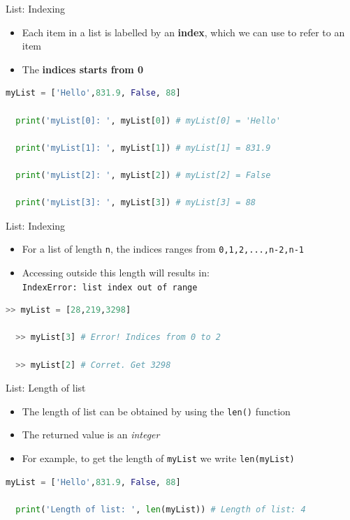\documentclass[10pt,xcolor={table,dvipsnames},t]{beamer}
\begin{document}
\begin{frame}[fragile]{List: Indexing}
  \begin{itemize}
    \item Each item in a list is labelled by an \textbf{index}, which we can use to refer to an item 
    \item The \textbf{indices starts from 0}
  \end{itemize}
\begin{lstlisting}[language=python]
  myList = ['Hello',831.9, False, 88]

  print('myList[0]: ', myList[0]) # myList[0] = 'Hello'

  print('myList[1]: ', myList[1]) # myList[1] = 831.9

  print('myList[2]: ', myList[2]) # myList[2] = False

  print('myList[3]: ', myList[3]) # myList[3] = 88
\end{lstlisting}
\end{frame}

\begin{frame}[fragile]{List: Indexing}
  \begin{itemize}
    \item For a list of length \texttt{n}, the indices ranges from \texttt{0,1,2,...,n-2,n-1}
    \item Accessing outside this length will results in:\\
     \texttt{IndexError: list index out of range}
  \end{itemize}
\begin{lstlisting}[language=python]
  >> myList = [28,219,3298]

  >> myList[3] # Error! Indices from 0 to 2

  >> myList[2] # Corret. Get 3298 

\end{lstlisting}
\end{frame}

\begin{frame}[fragile]{List: Length of list}
  \begin{itemize}
    \item The length of list can be obtained by using the \texttt{len()} function
    \item The returned value is an \textit{integer}
    \item For example, to get the length of \texttt{myList} we write \texttt{len(myList)}
  \end{itemize}
\begin{lstlisting}[language=python]
  myList = ['Hello',831.9, False, 88]

  print('Length of list: ', len(myList)) # Length of list: 4
\end{lstlisting}
\end{frame}
\end{document}
